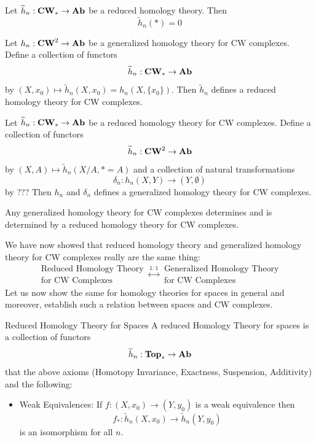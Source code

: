 \documentclass[a4paper]{article}
\begin{document}
\begin{lmm}{}{} Let $\widetilde{h}_n:\bold{CW}_\ast\to\bold{Ab}$ be a reduced homology theory. Then $$\widetilde{h}_n(\ast)=0$$
\end{lmm}

\begin{thm}{}{} Let $h_n:\bold{CW}^2\to\bold{Ab}$ be a generalized homology theory for CW complexes. Define a collection of functors $$\widetilde{h}_n:\bold{CW}_\ast\to\bold{Ab}$$ by $(X,x_0)\mapsto\widetilde{h}_n(X,x_0)=h_n(X,\{x_0\})$. Then  $\widetilde{h}_n$ defines a reduced homology theory for CW complexes. 
\end{thm}

\begin{thm}{}{} Let $\widetilde{h}_n:\bold{CW}_\ast\to\bold{Ab}$ be a reduced homology theory for CW complexes. Define a collection of functors $$\widetilde{h}_n:\bold{CW}^2\to\bold{Ab}$$ by $(X,A)\mapsto\widetilde{h}_n(X/A,\ast=A)$ and a collection of natural transformations $$\delta_n:h_n(X,Y)\to(Y,\emptyset)$$ by ??? Then $h_n$ and $\delta_n$ defines a generalized homology theory for CW complexes. 
\end{thm}

\begin{thm}{}{} Any generalized homology theory for CW complexes determines and is determined by a reduced homology theory for CW complexes. 
\end{thm}

We have now showed that reduced homology theory and generalized homology theory for CW complexes really are the same thing: $$\substack{\text{Reduced Homology Theory}\\\text{for CW Complexes}}\overset{1:1}{\longleftrightarrow}\substack{\text{Generalized Homology Theory}\\\text{for CW Complexes}}$$ Let us now show the same for homology theories for spaces in general and moreover, establish such a relation between spaces and CW complexes. 

\begin{defn}{Reduced Homology Theory for Spaces}{} A reduced Homology Theory for spaces is a collection of functors $$\widetilde{h}_n:\bold{Top}_\ast\to\bold{Ab}$$ that the above axioms (Homotopy Invariance, Exactness, Suspension, Additivity) and the following: 
\begin{itemize}
\item Weak Equivalences: If $f:(X,x_0)\to(Y,y_0)$ is a weak equivalence then $$f_\ast:\widetilde{h}_n(X,x_0)\to\widetilde{h}_n(Y,y_0)$$ is an isomorphism for all $n$. 
\end{itemize}
\end{defn}
\end{document}
